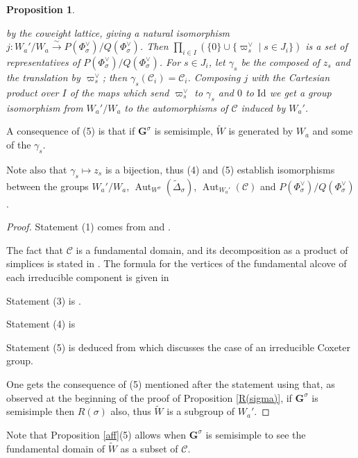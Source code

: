 \documentclass{amsart}
\newtheorem{proposition}[equation]{Proposition}
\numberwithin{equation}{section}
\theoremstyle{definition}
\theoremstyle{remark}
\newcommand\bG{{\mathbf G}}
\newcommand\CC{{\mathcal C}}
\newcommand\Gs{{\bG^\sigma}}
\newcommand\tW{{\widetilde W}}
\newcommand\Wa{W_a}
\DeclareMathOperator\Aut{\mathrm{Aut}}
\newcommand\Id{\mathrm{Id}}
\begin{document}
\begin{proposition}
\begin{enumerate}
by the coweight lattice, giving a natural isomorphism 
$j:\Wa'/\Wa\xrightarrow\sim P(\Phi_\sigma^\vee)/Q(\Phi_\sigma^\vee)$.
Then $\prod_{i\in I}(\{0\}\cup\{\varpi_s^\vee\mid s\in J_i\})$ is a
set of representatives of
$P(\Phi_\sigma^\vee)/Q(\Phi_\sigma^\vee)$.
For $s\in J_i$, let  $\gamma_s$ be the composed of $z_s$ and the
translation  by $\varpi^\vee_s$;
then $\gamma_s(\CC_i)=\CC_i$.
Composing $j$ with the Cartesian product over $I$ of the maps
which send $\varpi^\vee_s$ to $\gamma_s$ and $0$ to $\Id$ we 
get a group isomorphism from $\Wa'/\Wa$ to the automorphisms of $\CC$ induced 
by $\Wa'$.
\end{enumerate}
\end{proposition}
A consequence of (5) is that if $\Gs$ is semisimple,
$\tW$ is generated by $\Wa$ and some of the $\gamma_s$.

Note also that $\gamma_s\mapsto z_s$ is a bijection, thus (4) and (5) establish
isomorphisms between the groups $\Wa'/\Wa$, $\Aut_{W^\sigma}(\tilde\Delta_\sigma)$,
$\Aut_{\Wa'}(\CC)$ and $P(\Phi_\sigma^\vee)/Q(\Phi_\sigma^\vee)$.
\begin{proof}Statement (1) comes from \cite[Ch.\ V, \S3, Th.1]{Bou} and
\cite[Ch.\ VI \S2, Prop.5]{Bou}.

The fact that $\CC$ is a fundamental
domain, and its decomposition as a product of simplices is stated in
\cite[Ch.\ VI, \S2, end of no 1]{Bou}. The formula for the vertices of the
fundamental alcove of
each irreducible component is given in \cite[Ch.\ VI, \S2 Cor.\ of Prop.5]{Bou}

Statement (3) is \cite[Ch.\ VI, \S2 Prop.5 (i)]{Bou}.

Statement (4) is \cite[(3.5)]{cedric}

Statement (5) is deduced from
\cite[Ch.\ VI, \S2 no 3, Prop.6 and its corollary]{Bou} which discusses the
case of an irreducible Coxeter group. 

One gets the consequence of (5) mentioned after the statement using that, 
as observed at the beginning of the proof of Proposition \ref{R(sigma)},
if $\Gs$ is semisimple then $R(\sigma)$ also, thus $\tW$ is a subgroup of $\Wa'$.
\end{proof}
Note that Proposition \ref{aff}(5) allows when $\Gs$ is semisimple to see the 
fundamental domain of $\tW$ as a subset of $\CC$.
\end{document}

